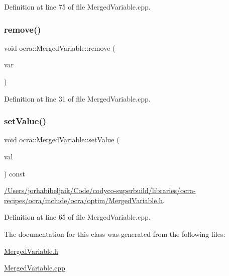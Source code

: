 Definition at line 75 of file Merged\+Variable.\+cpp.

\hypertarget{classocra_1_1MergedVariable_ae0a14af6f9fb0b0dc72d6023e7e40069}{}\label{classocra_1_1MergedVariable_ae0a14af6f9fb0b0dc72d6023e7e40069} 
\subsubsection{\texorpdfstring{remove()}{remove()}}
{\footnotesize\ttfamily void ocra\+::\+Merged\+Variable\+::remove (\begin{DoxyParamCaption}\item[{\hyperlink{classocra_1_1Variable}{Variable} $\ast$}]{var }\end{DoxyParamCaption})}



Definition at line 31 of file Merged\+Variable.\+cpp.

\hypertarget{classocra_1_1MergedVariable_a2c53faf60a0aa267457aa6688b7341aa}{}\label{classocra_1_1MergedVariable_a2c53faf60a0aa267457aa6688b7341aa} 
\subsubsection{\texorpdfstring{set\+Value()}{setValue()}}
{\footnotesize\ttfamily void ocra\+::\+Merged\+Variable\+::set\+Value (\begin{DoxyParamCaption}\item[{const Vector\+Xd \&}]{val }\end{DoxyParamCaption}) const}

\begin{Desc}
\item[Examples\+: ]\par
\hyperlink{_2Users_2jorhabibeljaik_2Code_2codyco-superbuild_2libraries_2ocra-recipes_2ocra_2include_2ocra_27dfe52ed2d2fe1904154f5be9150e8b1}{/\+Users/jorhabibeljaik/\+Code/codyco-\/superbuild/libraries/ocra-\/recipes/ocra/include/ocra/optim/\+Merged\+Variable.\+h}.\end{Desc}


Definition at line 65 of file Merged\+Variable.\+cpp.



The documentation for this class was generated from the following files\+:\begin{DoxyCompactItemize}
\item 
\hyperlink{MergedVariable_8h}{Merged\+Variable.\+h}\item 
\hyperlink{MergedVariable_8cpp}{Merged\+Variable.\+cpp}\end{DoxyCompactItemize}
